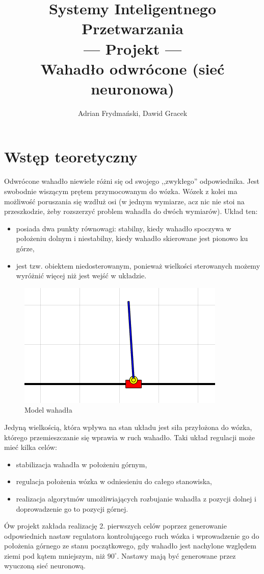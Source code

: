 \documentclass[10pt,a4paper,titlepage]{article}
\author{Adrian Frydmański, Dawid Gracek}
\title{Systemy Inteligentnego Przetwarzania\\--- Projekt ---\\Wahadło odwrócone (sieć neuronowa)}
\begin{document}
	\maketitle
	\clearpage
	\section{Wstęp teoretyczny}
	Odwrócone wahadło niewiele różni się od swojego ,,zwykłego'' odpowiednika. Jest swobodnie wiszącym prętem przymocowanym do wózka. Wózek z kolei ma możliwość poruszania się wzdłuż osi (w jednym wymiarze, acz nic nie stoi na przeszkodzie, żeby rozszerzyć problem wahadła do dwóch wymiarów). Układ ten:
	\begin{itemize}
		\item posiada dwa punkty równowagi: stabilny, kiedy wahadło spoczywa w położeniu dolnym i niestabilny, kiedy wahadło skierowane jest pionowo ku górze,
		\item jest tzw. obiektem niedosterowanym, ponieważ wielkości sterowanych możemy wyróżnić więcej niż jest wejść w układzie.
	\end{itemize}

	\begin{figure}[H]
		\center
		\includegraphics[width=.6\textwidth]{w.png}
		\caption{Model wahadła}
	\end{figure}
	
	Jedyną wielkością, która wpływa na stan układu jest siła przyłożona do wózka, którego przemieszczanie się wprawia w ruch wahadło. Taki układ regulacji może mieć kilka celów:
	\begin{itemize}
		\item stabilizacja wahadła w położeniu górnym,
		\item regulacja położenia wózka w odniesieniu do całego stanowiska,
		\item realizacja algorytmów umożliwiających rozbujanie wahadła z pozycji dolnej i doprowadzenie go to pozycji górnej.
	\end{itemize}
	
	Ów projekt zakłada realizację 2. pierwszych celów poprzez generowanie odpowiednich nastaw regulatora kontrolującego ruch wózka i wprowadzenie go do położenia górnego ze stanu początkowego, gdy wahadło jest nachylone względem ziemi pod kątem mniejszym, niż $90^\circ$. Nastawy mają być generowane przez wyuczoną sieć neuronową.
	
\end{document}
